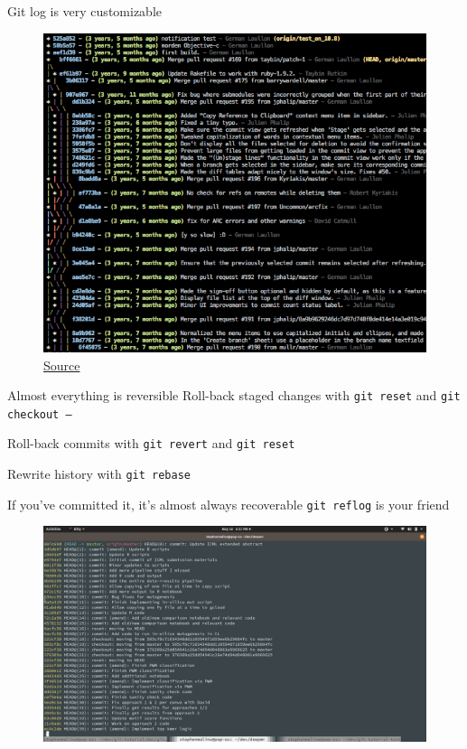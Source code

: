 \documentclass[pdf]{beamer} %
\begin{document}
\begin{frame}[fragile]{Git log is very customizable}
    \begin{figure}[htpb]
        \centering
        \includegraphics[width=1\linewidth]{fig/git-log-pretty.png}
        \caption{\href{https://mackyle.github.io/git-log-compact/}{Source}}
        \label{fig:git-log-pretty}
    \end{figure}
\end{frame}

\begin{frame}{Almost everything is reversible}
    Roll-back staged changes with \texttt{git reset} and \texttt{git checkout -- }

    \bigskip
    Roll-back commits with \texttt{git revert} and \texttt{git reset}

    \bigskip
    Rewrite history with \texttt{git rebase}
\end{frame}

\begin{frame}[fragile]{If you've committed it, it's almost always recoverable}
    \texttt{git reflog} is your friend

    \begin{figure}[htpb]
        \centering
        \includegraphics[width=0.8\linewidth]{fig/git-reflog.png}
        \caption{}
        \label{fig:git-reflog}
    \end{figure}
    
\end{frame}
\end{document}
